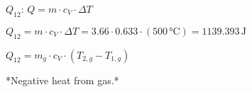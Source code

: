 \( Q_{12} \): \( Q = m \cdot c_{V} \cdot \Delta T \)  

\( Q_{12} = m \cdot c_{V} \cdot \Delta T = 3.66 \cdot 0.633 \cdot (500 \, \text{°C}) = 1139.393 \, \text{J} \)  

\( Q_{12} = m_{g} \cdot c_{V} \cdot (T_{2,g} - T_{1,g}) \)  

*Negative heat from gas.*